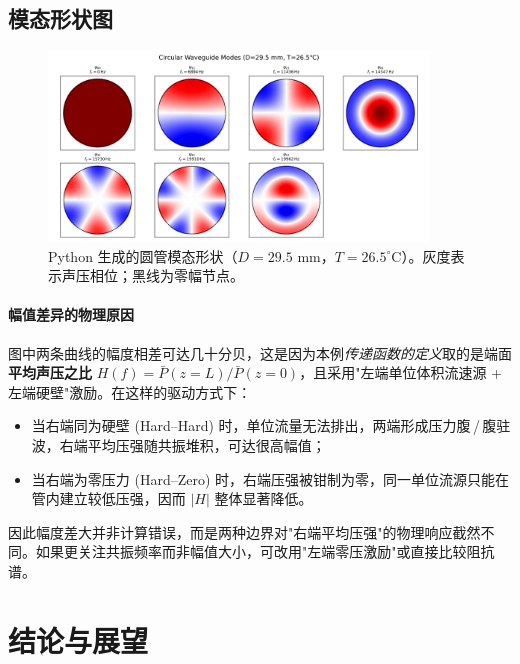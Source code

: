 \documentclass[12pt,a4paper]{article}
\begin{document}
\subsection{模态形状图}

\begin{figure}[h]
    \centering
    \includegraphics[width=0.9\textwidth]{../02-code/circle_modes.png}
    \caption{Python 生成的圆管模态形状（$D=29.5$ mm，$T=26.5^{\circ}$C）。灰度表示声压相位；黑线为零幅节点。}
    \label{fig:circ-modes}
\end{figure}

\paragraph{幅值差异的物理原因} 图中两条曲线的幅度相差可达几十分贝，这是因为本例\emph{传递函数的定义}取的是端面\textbf{平均声压之比} $H(f)=\bar P(z=L)/\bar P(z=0)$，且采用"左端单位体积流速源 + 左端硬壁"激励。在这样的驱动方式下：
\begin{itemize}
  \item 当右端同为硬壁 (Hard--Hard) 时，单位流量无法排出，两端形成压力腹\,/\,腹驻波，右端平均压强随共振堆积，可达很高幅值；
  \item 当右端为零压力 (Hard--Zero) 时，右端压强被钳制为零，同一单位流源只能在管内建立较低压强，因而 $|H|$ 整体显著降低。
\end{itemize}
因此幅度差大并非计算错误，而是两种边界对"右端平均压强"的物理响应截然不同。如果更关注共振频率而非幅值大小，可改用"左端零压激励"或直接比较阻抗谱。

\section{结论与展望}
\end{document}
